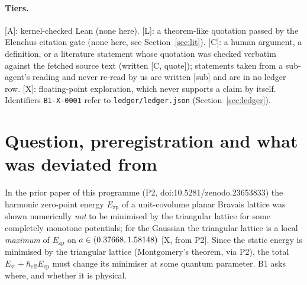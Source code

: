 \documentclass[10pt]{article}
\newcommand{\tier}[1]{\textsf{[#1]}}
\newcommand{\sub}{\textsf{[sub]}}
\newcommand{\hb}{\hbar_{\mathrm{eff}}}
\newcommand{\Ezp}{E_{\mathrm{zp}}}
\newcommand{\Est}{E_{\mathrm{st}}}
\begin{document}
\begin{abstract}
the harmonic $\Lambda_1$ winners sit on the harmonic stability edge. \textbf{Tier C (quotation-checked literature; no Tier L).} Rydberg dressing realises a soft shoulder whose Fourier transform is negative in places, not a Gaussian; a pure Gaussian has no negative Fourier component, and Prestipino et al.\ call it the marginal non-clustering case.
\textbf{Inference, not literature (Tier X):} that ordinary quantum melting preempts the harmonic transition rests only on our Lindemann numbers and SCHA, as qualified above. The earlier result that the triangular lattice is a local maximum of $\Ezp$ (doi:10.5281/zenodo.23653833) stands as a statement about the harmonic functional only. A new Rust SCHA module (rusty-SUNDIALS commit \texttt{9e85e15}) is part of the work.
\end{abstract}

\paragraph{Tiers.} \tier{A}: kernel-checked Lean (none here). \tier{L}: a theorem-like quotation passed by the Elenchus citation gate (none here, see Section~\ref{sec:lit}). \tier{C}: a human argument, a
definition, or a literature statement whose quotation was checked verbatim against the fetched source text (written \tier{C, quote}); statements taken from a sub-agent's reading and never re-read by us are written \sub{} and are in
no ledger row. \tier{X}: floating-point exploration, which never supports a claim by itself. Identifiers \texttt{B1-X-0001} refer to \texttt{ledger/ledger.json} (Section~\ref{sec:ledger}).

\section{Question, preregistration and what was deviated from}\label{sec:setting}
In the prior paper of this programme (P2, doi:10.5281/zenodo.23653833) the harmonic zero-point energy $\Ezp$ of a unit-covolume planar Bravais lattice was shown numerically \emph{not} to be minimised by the triangular
lattice for some completely monotone potentials; for the Gaussian the triangular lattice is a local \emph{maximum} of $\Ezp$ on $a\in(0.37668,1.58148)$ \tier{X, from P2}. Since the static energy is minimised by the triangular lattice (Montgomery's theorem,
via P2), the total $\Est+\hb\Ezp$ must change its minimiser at some quantum parameter. B1 asks where, and whether it is physical.
\end{document}
